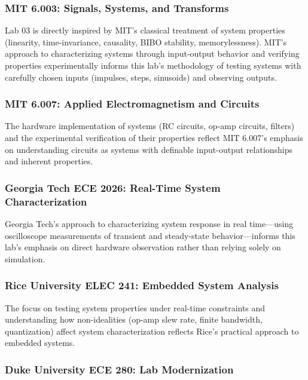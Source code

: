 \documentclass[11pt,letterpaper]{article}
\begin{document}
\subsubsection*{MIT 6.003: Signals, Systems, and Transforms}

Lab 03 is directly inspired by MIT's classical treatment of system properties (linearity, time-invariance, causality, BIBO stability, memorylessness). MIT's approach to characterizing systems through input-output behavior and verifying properties experimentally informs this lab's methodology of testing systems with carefully chosen inputs (impulses, steps, sinusoids) and observing outputs.

\subsubsection*{MIT 6.007: Applied Electromagnetism and Circuits}

The hardware implementation of systems (RC circuits, op-amp circuits, filters) and the experimental verification of their properties reflect MIT 6.007's emphasis on understanding circuits as systems with definable input-output relationships and inherent properties.

\subsubsection*{Georgia Tech ECE 2026: Real-Time System Characterization}

Georgia Tech's approach to characterizing system response in real time—using oscilloscope measurements of transient and steady-state behavior—informs this lab's emphasis on direct hardware observation rather than relying solely on simulation.

\subsubsection*{Rice University ELEC 241: Embedded System Analysis}

The focus on testing system properties under real-time constraints and understanding how non-idealities (op-amp slew rate, finite bandwidth, quantization) affect system characterization reflects Rice's practical approach to embedded systems.

\subsubsection*{Duke University ECE 280: Lab Modernization}
\end{document}

